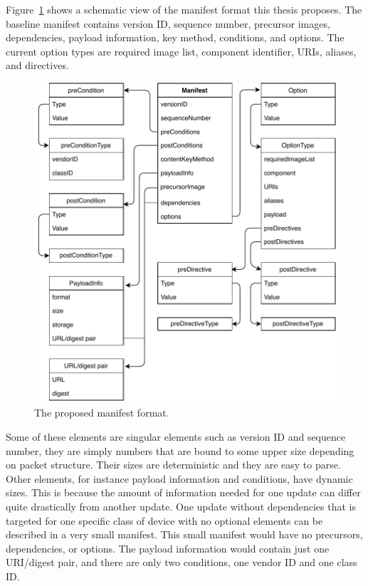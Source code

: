 \documentclass[0-thesis.tex]{subfiles}
\begin{document}
Figure~\ref{fig:manifest-format} shows a schematic view of the manifest format this thesis
proposes. The baseline manifest contains version ID, sequence number, precursor images,
dependencies, payload information, key method, conditions, and options. The current option
types are required image list, component identifier, URIs, aliases, and directives.

\begin{figure}
    \caption{The proposed manifest format.}
    \label{fig:manifest-format}
    \includegraphics{images/manifest-format.pdf}
\end{figure}

Some of these elements are singular elements such as version ID and sequence number, they
are simply numbers that are bound to some upper size depending on packet structure. Their
sizes are deterministic and they are easy to parse. Other elements, for instance payload
information and conditions, have dynamic sizes. This is because the amount of information
needed for one update can differ quite drastically from another update. One update without
dependencies that is targeted for one specific class of device with no optional elements
can be described in a very small manifest. This small manifest would have no precursors,
dependencies, or options. The payload information would contain just one URI/digest pair,
and there are only two conditions, one vendor ID and one class ID.
\end{document}
